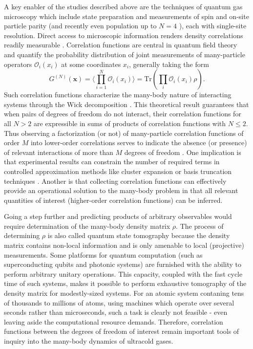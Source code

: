 	A key enabler of the studies described above are the techniques of quantum gas microscopy \cite{Bakr09,Cheuk15,Endres11,Haller15,Miranda15,Parsons15,Rispoli19,Sherson10,Miranda17,Preiss15a} which include state preparation and measurements of spin and on-site particle parity (and recently even population up to $N=4$ \cite{Preiss15a}), each with single-site resolution.
	Direct access to microscopic information renders density correlations readily measurable \cite{Endres11,Rispoli19}.
	Correlation functions are central in quantum field theory and quantify the probability distribution of joint measurements of many-particle operators $\mathcal{O}_i(x_i)$ at some coordinates $x_i$, generally taking the form
	\begin{equation}
		G^{(N)}(\textbf{x}) = \langle \prod_{i=1}^{N}\mathcal{O}_i(x_i)\rangle = \textrm{Tr}\left(\prod_i\mathcal{O}_i(x_i) \rho\right).
	\end{equation}
	Such correlation functions characterize the many-body nature of interacting systems through the Wick decomposition \cite{Wick50}.
	This theoretical result guarantees that when pairs of degrees of freedom do not interact, their correlation functions for all $N>2$ are expressible in sums of products of correlation functions with $N\leq2$.
	Thus observing a factorization (or not) of many-particle correlation functions of order $M$ into lower-order correlations serves to indicate the absence (or presence) of relevant interactions of more than $M$ degrees of freedom \cite{Schweigler17}.
	One implication is that experimental results can constrain the number of required terms in controlled approximation methods like cluster expansion or basis truncation techniques \cite{Hodgman17}.
	Another is that collecting correlation functions can effectively provide an operational solution to the many-body problem \cite{Schweigler17,Hodgman17} in that all relevant quantities of interest (higher-order correlation functions) can be inferred.

	Going a step further and predicting products of arbitrary observables would require determination of the many-body density matrix $\rho$.
	The process of determining $\rho$ is also called quantum state tomography because the density matrix contains non-local information and is only amenable to local (projective) measurements.
	Some platforms for quantum computation (such as superconducting qubits and photonic systems) are furnished with the ability to perform arbitrary unitary operations. 
	This capacity, coupled with the fast cycle time of such systems, makes it possible to perform exhaustive tomography of the density matrix for modestly-sized systems.
	For an atomic system contaning tens of thousands to millions of atoms, using machines which operate over several seconds rather than microseconds, such a task is clearly not feasible - even leaving aside the computational resource demands.
	Therefore, correlation functions between the degrees of freedom of interest remain important tools of inquiry into the many-body dynamics of ultracold gases.
	
